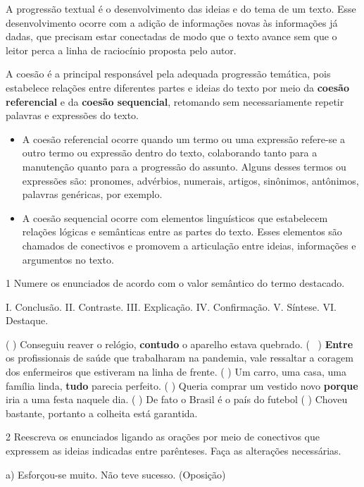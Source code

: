 A progressão textual é o desenvolvimento das ideias e do tema de um
texto. Esse desenvolvimento ocorre com a adição de informações novas às
informações já dadas, que precisam estar conectadas de modo que o texto
avance sem que o leitor perca a linha de raciocínio proposta pelo autor.

A coesão é a principal responsável pela adequada progressão temática,
pois estabelece relações entre diferentes partes e ideias do texto por
meio da \textbf{coesão referencial} e da \textbf{coesão sequencial},
retomando sem necessariamente repetir palavras e expressões do texto.

\begin{itemize}
\item
  A coesão referencial ocorre quando um termo ou uma expressão refere-se
  a outro termo ou expressão dentro do texto, colaborando tanto para a
  manutenção quanto para a progressão do assunto. Alguns desses termos
  ou expressões são: pronomes, advérbios, numerais, artigos, sinônimos,
  antônimos, palavras genéricas, por exemplo.
\item
  A coesão sequencial ocorre com elementos linguísticos que estabelecem
  relações lógicas e semânticas entre as partes do texto. Esses
  elementos são chamados de conectivos e promovem a articulação entre
  ideias, informações e argumentos no texto.
\end{itemize}


\num{1} Numere os enunciados de acordo com o valor semântico do termo
destacado.

I. Conclusão. II. Contraste. III. Explicação. IV. Confirmação. V.
Síntese. VI. Destaque.

(  ) Conseguiu reaver o relógio, \textbf{contudo} o aparelho
estava quebrado. (~ ) \textbf{Entre} os profissionais de
saúde que trabalharam na pandemia, vale ressaltar a coragem dos
enfermeiros que estiveram na linha de frente. (  ) Um carro,
uma casa, uma família linda, \textbf{tudo} parecia perfeito. (
 ) Queria comprar um vestido novo \textbf{porque} iria a uma
festa naquele dia. (  ) De fato o Brasil é o país do futebol
(  ) Choveu bastante, portanto a colheita está garantida.

\num{2} Reescreva os enunciados ligando as orações por meio de
conectivos que expressem as ideias indicadas entre parênteses. Faça as
alterações necessárias.

a) Esforçou-se muito. Não teve sucesso. (Oposição)

